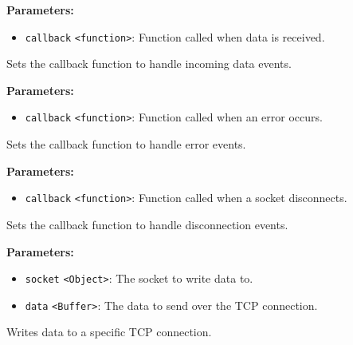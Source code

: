 \documentclass[12pt,a4paper]{article}
\begin{document}
\noindent \textbf{Parameters:}
\begin{itemize}
  \item \texttt{callback} \texttt{<function>}: Function called when data is received.
\end{itemize}

\noindent Sets the callback function to handle incoming data events.

\vspace{5mm}
\noindent {}


\noindent \textbf{Parameters:}
\begin{itemize}
  \item \texttt{callback} \texttt{<function>}: Function called when an error occurs.
\end{itemize}

\noindent Sets the callback function to handle error events.

\vspace{5mm}
\noindent {}


\noindent \textbf{Parameters:}
\begin{itemize}
  \item \texttt{callback} \texttt{<function>}: Function called when a socket disconnects.
\end{itemize}

\noindent Sets the callback function to handle disconnection events.

\vspace{5mm}
\noindent {}


\noindent \textbf{Parameters:}
\begin{itemize}
  \item \texttt{socket} \texttt{<Object>}: The socket to write data to.
  \item \texttt{data} \texttt{<Buffer>}: The data to send over the TCP connection.
\end{itemize}

\noindent Writes data to a specific TCP connection.

\vspace{5mm}
\noindent {}
\end{document}

